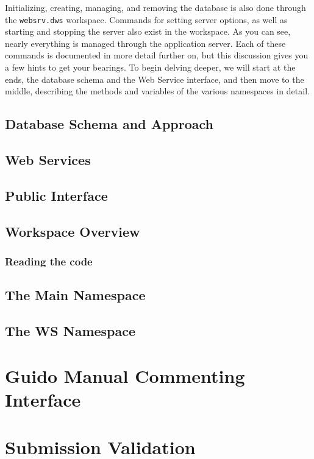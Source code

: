 Initializing, creating, managing, and removing the database is also done through
the {\tt websrv.dws} workspace. Commands for setting server options, as well as
starting and stopping the server also exist in the workspace. As you can see, 
nearly everything is managed through the application server. Each of these 
commands is documented in more detail further on, but this discussion gives you 
a few hints to get your bearings.
To begin delving deeper, we will start at the ends, the database schema and 
the Web Service interface, and then move to the middle, describing the methods 
and variables of the various namespaces in detail.

\section{Database Schema and Approach}

\section{Web Services}

\section{Public Interface}

\section{Workspace Overview}

\subsection{Reading the code}

\section{The Main Namespace}

\section{The WS Namespace}

\chapter{Guido Manual Commenting Interface}

\chapter{Submission Validation}

